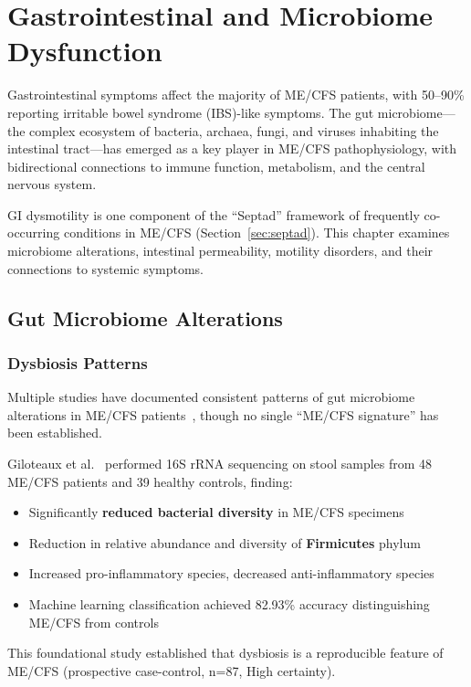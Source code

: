 \chapter{Gastrointestinal and Microbiome Dysfunction}
\label{ch:gut-microbiome}

Gastrointestinal symptoms affect the majority of ME/CFS patients, with 50--90\% reporting irritable bowel syndrome (IBS)-like symptoms. The gut microbiome---the complex ecosystem of bacteria, archaea, fungi, and viruses inhabiting the intestinal tract---has emerged as a key player in ME/CFS pathophysiology, with bidirectional connections to immune function, metabolism, and the central nervous system.

GI dysmotility is one component of the ``Septad'' framework of frequently co-occurring conditions in ME/CFS (Section~\ref{sec:septad}). This chapter examines microbiome alterations, intestinal permeability, motility disorders, and their connections to systemic symptoms.

\section{Gut Microbiome Alterations}
\label{sec:microbiome}

\subsection{Dysbiosis Patterns}

Multiple studies have documented consistent patterns of gut microbiome alterations in ME/CFS patients~\cite{Giloteaux2016}, though no single ``ME/CFS signature'' has been established.

\begin{achievement}
\label{ach:microbiome-diversity}
Giloteaux et al.~\cite{Giloteaux2016} performed 16S rRNA sequencing on stool samples from 48 ME/CFS patients and 39 healthy controls, finding:
\begin{itemize}
    \item Significantly \textbf{reduced bacterial diversity} in ME/CFS specimens
    \item Reduction in relative abundance and diversity of \textbf{Firmicutes} phylum
    \item Increased pro-inflammatory species, decreased anti-inflammatory species
    \item Machine learning classification achieved 82.93\% accuracy distinguishing ME/CFS from controls
\end{itemize}
This foundational study established that dysbiosis is a reproducible feature of ME/CFS (prospective case-control, n=87, High certainty).
\end{achievement}

